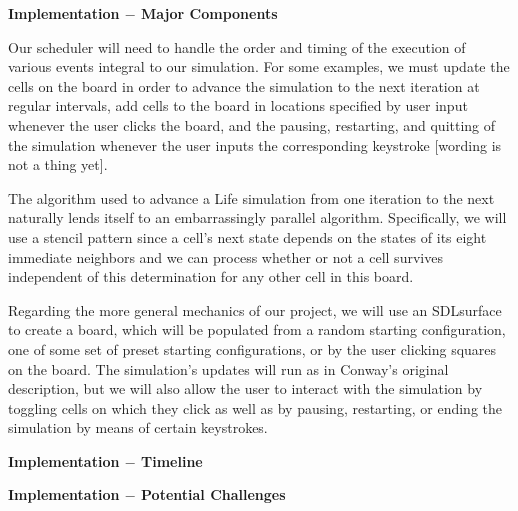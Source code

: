 \documentclass[12pt]{article}
\begin{document}
\vspace{12mm} \textbf{Implementation $-$ Major Components}

\vspace{2mm} \hspace{10mm} Our scheduler will need to handle the order and timing of the execution of various events integral to our simulation. For some examples, we must update the cells on the board in order to advance the simulation to the next iteration at regular intervals, add cells to the board in locations specified by user input whenever the user clicks the board, and the pausing, restarting, and quitting of the simulation whenever the user inputs the corresponding keystroke [wording is not a thing yet]. 

\hspace{10mm} The algorithm used to advance a Life simulation from one iteration to the next naturally lends itself to an embarrassingly parallel algorithm. Specifically, we will use a stencil pattern since a cell's next state depends on the states of its eight immediate neighbors and we can process whether or not a cell survives independent of this determination for any other cell in this board. 

\hspace{10mm} Regarding the more general mechanics of our project, we will use an {\fnt SDL\underline{\hspace{3mm}}surface} to create a board, which will be populated from a random starting configuration, one of some set of preset starting configurations, or by the user clicking squares on the board. The simulation's updates will run as in Conway's original description, but we will also allow the user to interact with the simulation by toggling cells on which they click as well as by pausing, restarting, or ending the simulation by means of certain keystrokes. 








\vspace{12mm} \textbf{Implementation $-$ Timeline}

\vspace{2mm} \hspace{10mm} 







\vspace{12mm} \textbf{Implementation $-$ Potential Challenges}
\end{document}
